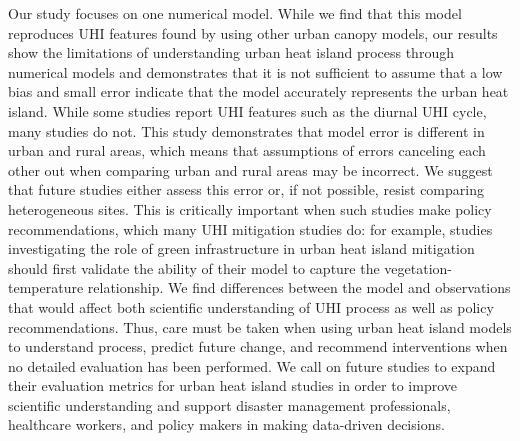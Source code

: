 Our study focuses on one numerical model. While we find that this model reproduces UHI features found by using other urban canopy models, our results show the limitations of understanding urban heat island process through numerical models and demonstrates that it is not sufficient to assume that a low bias and small error indicate that the model accurately represents the urban heat island.  
While some studies report UHI features such as the diurnal UHI cycle, many studies do not. 
This study demonstrates that model error is different in urban and rural areas, which means that assumptions of errors canceling each other out when comparing urban and rural areas may be incorrect. 
We suggest that future studies either assess this error or, if not possible, resist comparing heterogeneous sites. This is critically important when such studies make policy recommendations, which many UHI mitigation studies do: for example, studies investigating the role of green infrastructure in urban heat island mitigation should first validate the ability of their model to capture the vegetation-temperature relationship. 
We find differences between the model and observations that would affect both scientific understanding of UHI process as well as policy recommendations. 
Thus, care must be taken when using urban heat island models to understand process, predict future change, and recommend interventions when no detailed evaluation has been performed. We call on future studies to expand their evaluation metrics for urban heat island studies in order to improve scientific understanding and support disaster management professionals, healthcare workers, and policy makers in making data-driven decisions. 